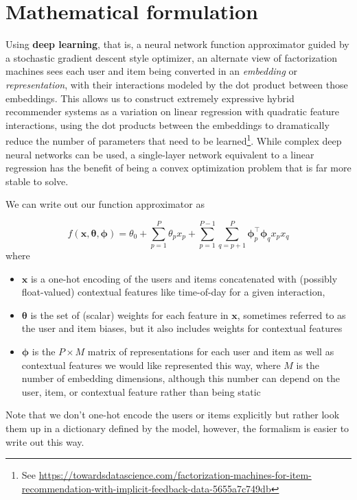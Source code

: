 \documentclass[manuscript, nonacm, screen=true]{acmart}
\begin{document}
\section{Mathematical formulation}

Using \textbf{deep learning}, that is, a neural network function approximator guided by a stochastic gradient descent style optimizer, an alternate view of factorization machines sees each user and item being converted in an \textit{embedding} or \textit{representation}, with their interactions modeled by the dot product between those embeddings. This allows us to construct extremely expressive hybrid recommender systems as a variation on linear regression with quadratic feature interactions, using the dot products between the embeddings to dramatically reduce the number of parameters that need to be learned\footnote{See \url{https://towardsdatascience.com/factorization-machines-for-item-recommendation-with-implicit-feedback-data-5655a7c749db}}. While complex deep neural networks can be used, a single-layer network equivalent to a linear regression has the benefit of being a convex optimization problem that is far more stable to solve.

We can write out our function approximator as

\begin{equation}
    f(\mathbf{x},\boldsymbol{\theta},\boldsymbol{\phi}) = \theta_0 + \sum_{p=1}^{P}\theta_p x_p + \sum_{p=1}^{P-1}\sum_{q=p+1}^{P}\boldsymbol{\phi}_p^\top \boldsymbol{\phi}_q x_p x_q
\end{equation}where 
\begin{itemize}
\item $\mathbf{x}$ is a one-hot encoding of the users and items concatenated with (possibly float-valued) contextual features like time-of-day for a given interaction,
\item  $\boldsymbol{\theta}$ is the set of (scalar) weights for each feature in $\mathbf{x}$, sometimes referred to as the user and item biases, but it also includes weights for contextual features
\item $\boldsymbol{\phi}$ is the $P\times M$ matrix of representations for each user and item as well as contextual features we would like represented this way, where $M$ is the number of embedding dimensions, although this number can depend on the user, item, or contextual feature rather than being static
\end{itemize}
Note that we don't one-hot encode the users or items explicitly but rather look them up in a dictionary defined by the model, however, the formalism is easier to write out this way. 
\end{document}
